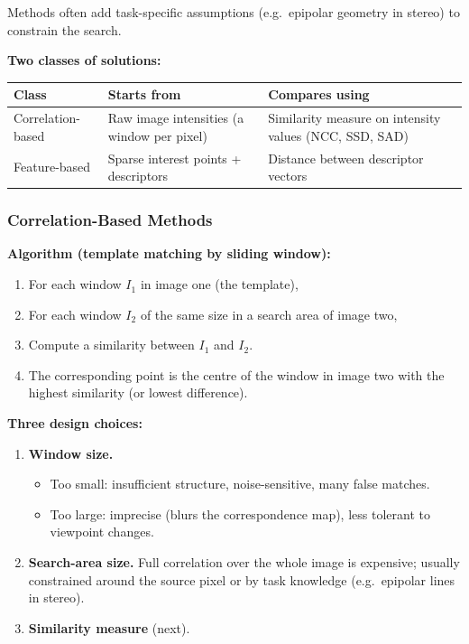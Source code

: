 Methods often add task-specific assumptions (e.g.\ epipolar geometry in stereo) to constrain the search.

\separator

\textbf{Two classes of solutions:}

\begin{center}
\renewcommand{\arraystretch}{1.3}
\begin{tabular}{@{} l p{5cm} p{5.2cm} @{}}
\toprule
\textbf{Class} & \textbf{Starts from} & \textbf{Compares using} \\
\midrule
Correlation-based & Raw image intensities (a window per pixel) & Similarity measure on intensity values (NCC, SSD, SAD) \\
Feature-based & Sparse interest points + descriptors & Distance between descriptor vectors \\
\bottomrule
\end{tabular}
\end{center}

\bigseparator

\subsubsection{Correlation-Based Methods}

\textbf{Algorithm (template matching by sliding window):}
\begin{enumerate}
  \item For each window $I_1$ in image one (the template),
  \item For each window $I_2$ of the same size in a search area of image two,
  \item Compute a similarity between $I_1$ and $I_2$.
  \item The corresponding point is the centre of the window in image two with the highest similarity (or lowest difference).
\end{enumerate}

\textbf{Three design choices:}
\begin{enumerate}
  \item \textbf{Window size.}
  \begin{itemize}
    \item Too small: insufficient structure, noise-sensitive, many false matches.
    \item Too large: imprecise (blurs the correspondence map), less tolerant to viewpoint changes.
  \end{itemize}
  \item \textbf{Search-area size.} Full correlation over the whole image is expensive; usually constrained around the source pixel or by task knowledge (e.g.\ epipolar lines in stereo).
  \item \textbf{Similarity measure} (next).
\end{enumerate}

